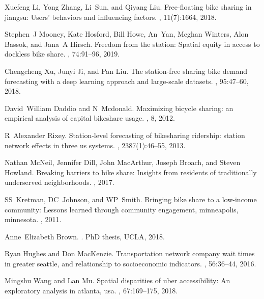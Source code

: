 Xuefeng Li, Yong Zhang, Li~Sun, and Qiyang Liu.
\newblock Free-floating bike sharing in jiangsu: Users’ behaviors and
  influencing factors.
, 11(7):1664, 2018.

Stephen~J Mooney, Kate Hosford, Bill Howe, An~Yan, Meghan Winters, Alon Bassok,
  and Jana~A Hirsch.
\newblock Freedom from the station: Spatial equity in access to dockless bike
  share.
, 74:91--96, 2019.

Chengcheng Xu, Junyi Ji, and Pan Liu.
\newblock The station-free sharing bike demand forecasting with a deep learning
  approach and large-scale datasets.
,
  95:47--60, 2018.

David~William Daddio and N~Mcdonald.
\newblock Maximizing bicycle sharing: an empirical analysis of capital
  bikeshare usage.
, 8, 2012.

R~Alexander Rixey.
\newblock Station-level forecasting of bikesharing ridership: station network
  effects in three us systems.
, 2387(1):46--55, 2013.

Nathan McNeil, Jennifer Dill, John MacArthur, Joseph Broach, and Steven
  Howland.
\newblock Breaking barriers to bike share: Insights from residents of
  traditionally underserved neighborhoods.
, 2017.

SS~Kretman, DC~Johnson, and WP~Smith.
\newblock Bringing bike share to a low-income community: Lessons learned
  through community engagement, minneapolis, minnesota.
, 2011.

Anne~Elizabeth Brown.
.
\newblock PhD thesis, UCLA, 2018.

Ryan Hughes and Don MacKenzie.
\newblock Transportation network company wait times in greater seattle, and
  relationship to socioeconomic indicators.
, 56:36--44, 2016.

Mingshu Wang and Lan Mu.
\newblock Spatial disparities of uber accessibility: An exploratory analysis in
  atlanta, usa.
, 67:169--175, 2018.

